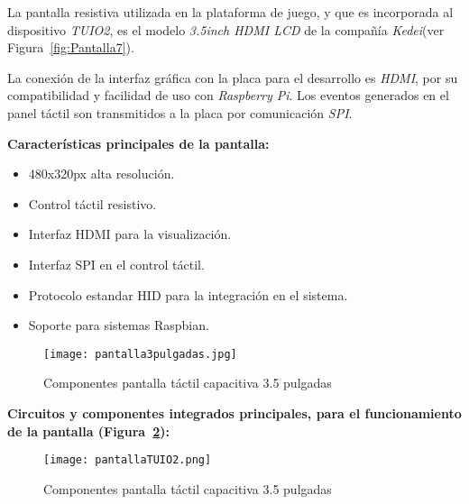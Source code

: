La pantalla resistiva utilizada en la plataforma de juego, y que es incorporada al dispositivo \emph{TUIO2}, es el modelo \emph{3.5inch HDMI LCD} de la compañía \emph{Kedei}(ver Figura~\ref{fig:Pantalla7}).

La conexión de la interfaz gráfica con la placa para el desarrollo es \emph{HDMI}, por su compatibilidad y facilidad de uso con \emph{Raspberry Pi}. Los eventos generados en el panel táctil son transmitidos a la placa por comunicación \emph{SPI}.

\textbf{Características principales de la pantalla:}
\begin{itemize}
\item 480x320px alta resolución.
\item Control táctil resistivo.
\item Interfaz HDMI para la visualización.
\item Interfaz SPI en el control táctil.
\item Protocolo estandar HID para la integración en el sistema.
\item Soporte para sistemas Raspbian.
\end{itemize}

\begin{figure}[!h]
\begin{center}
\texttt{[image: pantalla3pulgadas.jpg]}
\caption{Componentes pantalla táctil capacitiva 3.5 pulgadas}
\label{fig:Pantalla3}
\end{center}
\end{figure}

\textbf{Circuitos y componentes integrados principales, para el funcionamiento de la pantalla (Figura~\ref{fig:ProPantalla3}):
}
\begin{figure}[!h]
\begin{center}
\texttt{[image: pantallaTUIO2.png]}
\caption{Componentes pantalla táctil capacitiva 3.5 pulgadas}
\label{fig:ProPantalla3}
\end{center}
\end{figure}

